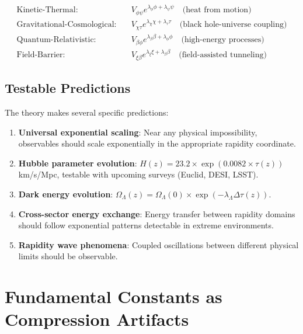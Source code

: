 \documentclass[12pt,a4paper]{article}
\begin{document}
\begin{align}
\text{Kinetic-Thermal:} \quad &V_{\phi\psi} e^{\lambda_\phi \phi + \lambda_\psi \psi} \quad \text{(heat from motion)} \\
\text{Gravitational-Cosmological:} \quad &V_{\chi\tau} e^{\lambda_\chi \chi + \lambda_\tau \tau} \quad \text{(black hole-universe coupling)} \\
\text{Quantum-Relativistic:} \quad &V_{\beta\phi} e^{\lambda_\beta \beta + \lambda_\phi \phi} \quad \text{(high-energy processes)} \\
\text{Field-Barrier:} \quad &V_{\xi\beta} e^{\lambda_\xi \xi + \lambda_\beta \beta} \quad \text{(field-assisted tunneling)}
\end{align}

\subsection{Testable Predictions}

The theory makes several specific predictions:

\begin{enumerate}
    \item \textbf{Universal exponential scaling}: Near any physical impossibility, observables should scale exponentially in the appropriate rapidity coordinate.
    
    \item \textbf{Hubble parameter evolution}: $H(z) = 23.2 \times \exp(0.0082 \times \tau(z))$ km/s/Mpc, testable with upcoming surveys (Euclid, DESI, LSST).
    
    \item \textbf{Dark energy evolution}: $\Omega_\Lambda(z) = \Omega_\Lambda(0) \times \exp(-\lambda_\Lambda \Delta\tau(z))$.
    
    \item \textbf{Cross-sector energy exchange}: Energy transfer between rapidity domains should follow exponential patterns detectable in extreme environments.
    
    \item \textbf{Rapidity wave phenomena}: Coupled oscillations between different physical limits should be observable.
\end{enumerate}

\section{Fundamental Constants as Compression Artifacts}
\end{document}
